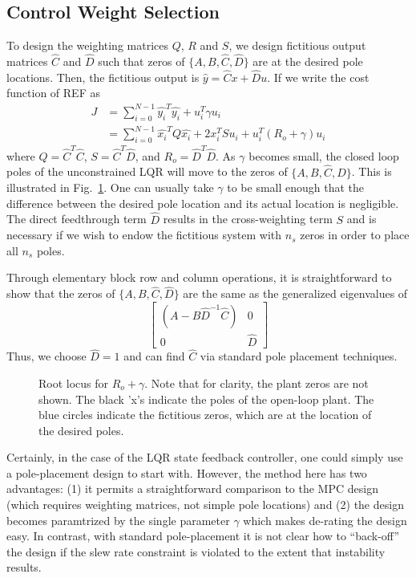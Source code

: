 \documentclass[journal,twocolumn,twoside]{IEEEtran}
\begin{document}
\subsection{Control Weight Selection}
To design the weighting matrices $Q$, $R$ and $S$, we design fictitious output matrices $\hat C$ and $\hat D$ such that zeros of $\{A, B, \hat C, \hat D\}$ are at the desired pole locations. Then, the fictitious output is $\hat y = \hat C x + \hat D u$. If we write the cost function of REF as
\begin{align}
  J &= \sum_{i=0}^{N-1} \hat{y_i}^T\hat{y_i} + u_i^T\gamma u_i\\
    &= \sum_{i=0}^{N-1} \hat{x_i}^TQ\hat{x_i} + 2x_i^TSu_i + u_i^T(R_o+\gamma)u_i
\end{align}
where $Q = \hat{C}^T\hat{C}$, $S =\hat{C}^T \hat{D}$, and $R_o = \hat{D}^T\hat{D}$. As $\gamma$ becomes small, the closed loop poles of the unconstrained LQR will move to the zeros of $\{A, B, \hat C, \hat D\}$. This is illustrated in Fig.~\ref{fig:lqr_locus}. One can usually take $\gamma$ to be small enough that the difference between the desired pole location and its actual location is negligible. The direct feedthrough term $\hat D$ results in the cross-weighting term $S$ and is necessary if we wish to endow the fictitious system with $n_s$ zeros in order to place all $n_s$ poles.

Through elementary block row and column operations, it is straightforward to show that the zeros of
$\{A, B, \hat C, \hat D\}$ are the same as the generalized eigenvalues of
\begin{equation}
  \begin{bmatrix}
    (A - B\hat{D}^{-1}\hat{C}) & 0\\
    0 & \hat{D}
  \end{bmatrix}
\end{equation}
Thus, we choose $\hat D = 1$ and can find $\hat C$ via standard pole placement techniques.

\begin{figure}
  
  \caption{Root locus for $R_o + \gamma$. Note that for clarity, the plant zeros are not shown. The black 'x's indicate the poles of the open-loop plant. The blue circles indicate the fictitious zeros, which are at the location of the desired poles. }
  \label{fig:lqr_locus}
\end{figure}

Certainly, in the case of the LQR state feedback controller, one could simply use a pole-placement design to start with. However, the method here has two advantages: (1) it permits a straightforward comparison to the MPC design (which requires weighting matrices, not simple pole locations) and (2) the design becomes paramtrized by the single parameter $\gamma$ which makes de-rating the design easy. In contrast, with standard pole-placement it is not clear how to ``back-off'' the design if the slew rate constraint is violated to the extent that instability results. 
\end{document}
